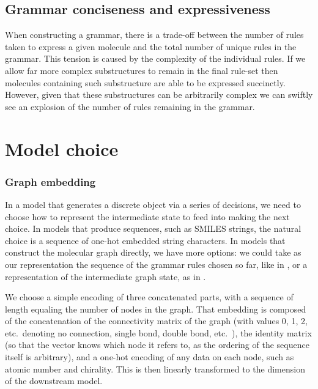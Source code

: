 \documentclass{article}
\begin{document}
\subsection{Grammar conciseness and expressiveness}\label{sec:expressiveness}
When constructing a grammar, there is a trade-off between the number of rules taken to express a given molecule and the total number of unique rules in the grammar. This tension is caused by the complexity of the individual rules. If we allow far more complex substructures to remain in the final rule-set then molecules containing such substructure are able to be expressed succinctly. However, given that these substructures can be arbitrarily complex we can swiftly see an explosion of the number of rules remaining in the grammar. 


\section{Model choice}\label{sec:model}
\subsubsection{Graph embedding}
In a model that generates a discrete object via a series of decisions, we need to choose how to represent the intermediate state to feed into making the next choice. In models that produce sequences, such as SMILES strings, the natural choice is a sequence of one-hot embedded string characters. In models that construct the molecular graph directly, we have more options: we could take as our representation the sequence of the grammar rules chosen so far, like in \cite{kusner2017, kraev2018}, or a representation of the intermediate graph state, as in \cite{you2018}.

We choose a simple encoding of three concatenated parts, with a sequence of length equaling the number of nodes in the graph. That embedding is composed of the concatenation of the connectivity matrix of the graph (with values 0, 1, 2, etc.~denoting no connection, single bond, double bond, etc.~), the identity matrix (so that the vector knows which node it refers to, as the ordering of the sequence itself is arbitrary), and a one-hot encoding of any data on each node, such as atomic number and chirality. This is then linearly transformed to the dimension of the downstream model.
\end{document}
